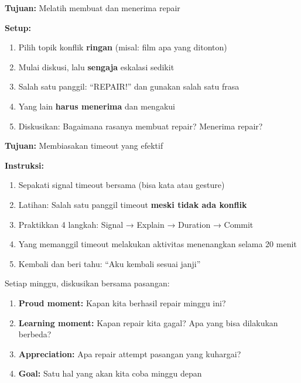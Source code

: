 \begin{exercisebox}
\textbf{Tujuan:} Melatih membuat dan menerima repair

\textbf{Setup:}
\begin{enumerate}
    \item Pilih topik konflik \textbf{ringan} (misal: film apa yang ditonton)
    \item Mulai diskusi, lalu \textbf{sengaja} eskalasi sedikit
    \item Salah satu panggil: ``REPAIR!'' dan gunakan salah satu frasa
    \item Yang lain \textbf{harus menerima} dan mengakui
    \item Diskusikan: Bagaimana rasanya membuat repair? Menerima repair?
\end{enumerate}
\end{exercisebox}

\begin{exercisebox}
\textbf{Tujuan:} Membiasakan timeout yang efektif

\textbf{Instruksi:}
\begin{enumerate}
    \item Sepakati signal timeout bersama (bisa kata atau gesture)
    \item Latihan: Salah satu panggil timeout \textbf{meski tidak ada konflik}
    \item Praktikkan 4 langkah: Signal → Explain → Duration → Commit
    \item Yang memanggil timeout melakukan aktivitas menenangkan selama 20 menit
    \item Kembali dan beri tahu: ``Aku kembali sesuai janji''
\end{enumerate}
\end{exercisebox}

\begin{exercisebox}
Setiap minggu, diskusikan bersama pasangan:
\begin{enumerate}
    \item \textbf{Proud moment:} Kapan kita berhasil repair minggu ini?
    \item \textbf{Learning moment:} Kapan repair kita gagal? Apa yang bisa dilakukan berbeda?
    \item \textbf{Appreciation:} Apa repair attempt pasangan yang kuhargai?
    \item \textbf{Goal:} Satu hal yang akan kita coba minggu depan
\end{enumerate}
\end{exercisebox}

